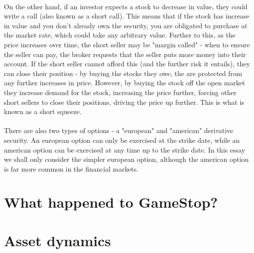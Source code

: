 \documentclass[11pt]{article} %
\begin{document}
\paragraph{}
On the other hand, if an investor expects a stock to decrease 
in value, they could write a call (also known as a short call). This 
means that if the stock has increase in value and you don't already own 
the security, you are obligated to purchase at the market rate, which 
could take any arbitrary value. Further to this, as the price increases 
over time, the short seller may be "margin called" - when to ensure the 
seller can pay, the broker requests that the seller puts more money into 
their account. If the short seller cannot afford this (and the further 
risk it entails), they can close their position - by buying the stocks 
they owe, the are protected from any further increases in price. However, 
by buying the stock off the open market they increase demand for the 
stock, increasing the price further, forcing other short sellers to 
close their positions, driving the price up further. This is what is 
known as a short squeeze.
\paragraph{}
There are also two types of options - a "european" and "american" 
derivative security. An european option can only be exercised at the 
strike date, while an american option can be exercised at any time up 
to the strike date. In this essay we shall only consider the simpler 
european option, although the american option is far more common in 
the financial markets.

\section{What happened to GameStop?}

\subsection{}

\section{Asset dynamics}\label{assetdyamics}
\end{document}
